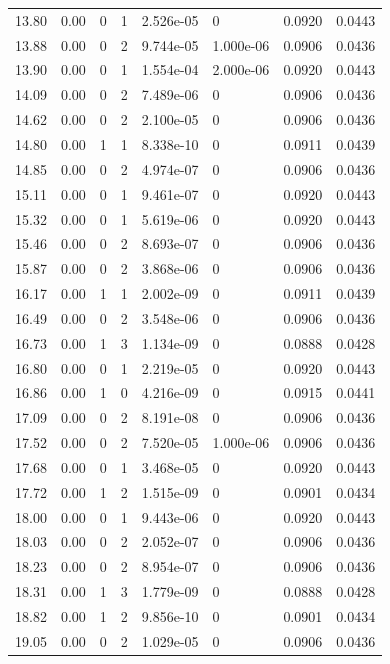 \documentclass[preview]{standalone}
\begin{document}
{{{\begin{tabular}{L{1.2cm}C{1.2cm} C{0.3cm}C{0.5cm} C{1.4cm}C{1.4cm} C{1.4cm}C{1.4cm}}
  13.80  &  0.00  & 0     &  1 &  2.526e-05  & 0  & 0.0920 &  0.0443   \\ 
  13.88  &  0.00  & 0     &  2 &  9.744e-05  & 1.000e-06  & 0.0906 &  0.0436   \\ 
  13.90  &  0.00  & 0     &  1 &  1.554e-04  & 2.000e-06  & 0.0920 &  0.0443   \\ 
  14.09  &  0.00  & 0     &  2 &  7.489e-06  & 0  & 0.0906 &  0.0436   \\ 
  14.62  &  0.00  & 0     &  2 &  2.100e-05  & 0  & 0.0906 &  0.0436   \\ 
  14.80  &  0.00  & 1     &  1 &  8.338e-10  & 0  & 0.0911 &  0.0439   \\ 
  14.85  &  0.00  & 0     &  2 &  4.974e-07  & 0  & 0.0906 &  0.0436   \\ 
  15.11  &  0.00  & 0     &  1 &  9.461e-07  & 0  & 0.0920 &  0.0443   \\ 
  15.32  &  0.00  & 0     &  1 &  5.619e-06  & 0  & 0.0920 &  0.0443   \\ 
  15.46  &  0.00  & 0     &  2 &  8.693e-07  & 0  & 0.0906 &  0.0436   \\ 
  15.87  &  0.00  & 0     &  2 &  3.868e-06  & 0  & 0.0906 &  0.0436   \\ 
  16.17  &  0.00  & 1     &  1 &  2.002e-09  & 0  & 0.0911 &  0.0439   \\ 
  16.49  &  0.00  & 0     &  2 &  3.548e-06  & 0  & 0.0906 &  0.0436   \\ 
  16.73  &  0.00  & 1     &  3 &  1.134e-09  & 0  & 0.0888 &  0.0428   \\ 
  16.80  &  0.00  & 0     &  1 &  2.219e-05  & 0  & 0.0920 &  0.0443   \\ 
  16.86  &  0.00  & 1     &  0 &  4.216e-09  & 0  & 0.0915 &  0.0441   \\ 
  17.09  &  0.00  & 0     &  2 &  8.191e-08  & 0  & 0.0906 &  0.0436   \\ 
  17.52  &  0.00  & 0     &  2 &  7.520e-05  & 1.000e-06  & 0.0906 &  0.0436   \\ 
  17.68  &  0.00  & 0     &  1 &  3.468e-05  & 0  & 0.0920 &  0.0443   \\ 
  17.72  &  0.00  & 1     &  2 &  1.515e-09  & 0  & 0.0901 &  0.0434   \\ 
  18.00  &  0.00  & 0     &  1 &  9.443e-06  & 0  & 0.0920 &  0.0443   \\ 
  18.03  &  0.00  & 0     &  2 &  2.052e-07  & 0  & 0.0906 &  0.0436   \\ 
  18.23  &  0.00  & 0     &  2 &  8.954e-07  & 0  & 0.0906 &  0.0436   \\ 
  18.31  &  0.00  & 1     &  3 &  1.779e-09  & 0  & 0.0888 &  0.0428   \\ 
  18.82  &  0.00  & 1     &  2 &  9.856e-10  & 0  & 0.0901 &  0.0434   \\ 
  19.05  &  0.00  & 0     &  2 &  1.029e-05  & 0  & 0.0906 &  0.0436   \\ 
\hline 
\end{tabular} 

}}}
\end{document}
